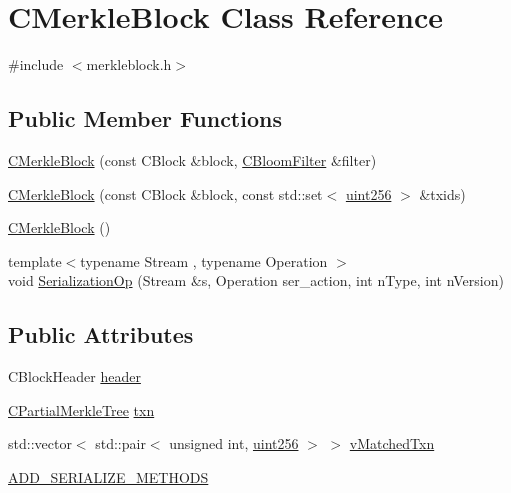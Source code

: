 \hypertarget{class_c_merkle_block}{}\section{C\+Merkle\+Block Class Reference}
\label{class_c_merkle_block}


{\ttfamily \#include $<$merkleblock.\+h$>$}

\subsection*{Public Member Functions}
\begin{DoxyCompactItemize}
\item 
\mbox{\hyperlink{class_c_merkle_block_a5d08ce7034216ca25b0f9eab6bf8c389}{C\+Merkle\+Block}} (const C\+Block \&block, \mbox{\hyperlink{class_c_bloom_filter}{C\+Bloom\+Filter}} \&filter)
\item 
\mbox{\hyperlink{class_c_merkle_block_a720f9e78e80b415cf6b607b189eec31b}{C\+Merkle\+Block}} (const C\+Block \&block, const std\+::set$<$ \mbox{\hyperlink{classuint256}{uint256}} $>$ \&txids)
\item 
\mbox{\hyperlink{class_c_merkle_block_a0f02da9fc9fda85f7f292f2c2874ed39}{C\+Merkle\+Block}} ()
\item 
{\footnotesize template$<$typename Stream , typename Operation $>$ }\\void \mbox{\hyperlink{class_c_merkle_block_ab803bbe1d359d6b377adf75dc526da92}{Serialization\+Op}} (Stream \&s, Operation ser\+\_\+action, int n\+Type, int n\+Version)
\end{DoxyCompactItemize}
\subsection*{Public Attributes}
\begin{DoxyCompactItemize}
\item 
C\+Block\+Header \mbox{\hyperlink{class_c_merkle_block_a3c1fcef77eee1b476b3f3fd52055748a}{header}}
\item 
\mbox{\hyperlink{class_c_partial_merkle_tree}{C\+Partial\+Merkle\+Tree}} \mbox{\hyperlink{class_c_merkle_block_ac2174e9e8ea6e429328deb5a69a05558}{txn}}
\item 
std\+::vector$<$ std\+::pair$<$ unsigned int, \mbox{\hyperlink{classuint256}{uint256}} $>$ $>$ \mbox{\hyperlink{class_c_merkle_block_a73bbbdcb5d83588b15461c02d0228999}{v\+Matched\+Txn}}
\item 
\mbox{\hyperlink{class_c_merkle_block_aa57b1f8bfa7d3adb65dc71e479889194}{A\+D\+D\+\_\+\+S\+E\+R\+I\+A\+L\+I\+Z\+E\+\_\+\+M\+E\+T\+H\+O\+DS}}
\end{DoxyCompactItemize}


